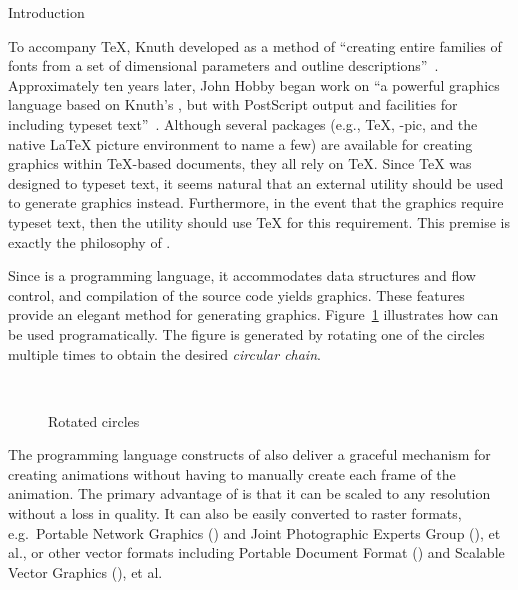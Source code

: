 \begin{section}{Introduction}
\addtocounter{footnote}{1}To accompany \TeX{}, Knuth developed \MF{} as a method of ``creating entire families of fonts from a set of dimensional parameters and outline descriptions''~\cite{beebe:mf}.  Approximately ten years later, John Hobby began work on \MP{}\Dash ``a powerful graphics language based on Knuth's \MF, but with PostScript output and facilities for including typeset text''~\cite{hobby:user}.  Although several packages (e.g., \PiC\TeX, \Xy-pic, and the native \LaTeX{} picture environment to name a few) are available for creating graphics within \TeX-based documents, they all rely on \TeX{}.  Since \TeX{} was designed to typeset text, it seems natural that an external utility should be used to generate graphics instead.  Furthermore, in the event that the graphics require typeset text, then the utility should use \TeX{} for this requirement.  This premise is exactly the philosophy of \MP.

Since \MP{} is a programming language, it accommodates data structures and flow control, and compilation of the \MP{} source code yields \EPS{} graphics.  These features provide an elegant method for generating graphics.  Figure~\ref{fig:circles} illustrates how \MP{} can be used programatically.  The figure is generated by rotating one of the circles multiple times to obtain the desired \textit{circular chain}. 
\begin{figure}[hptb]
   \begin{center}\,\end{center}
	\caption{Rotated circles}\label{fig:circles}
\end{figure} 
The programming language constructs of \MP{} also deliver a graceful mechanism for creating animations without having to manually create each frame of the animation.  The primary advantage of \EPS{} is that it can be scaled to any resolution without a loss in quality.  It can also be easily converted to raster formats, e.g.\ Portable Network Graphics (\PNG) and Joint Photographic Experts Group (\JPEG), et al., or other vector formats including Portable Document Format (\PDF) and Scalable Vector Graphics (\SVG), et al.
\end{section}
